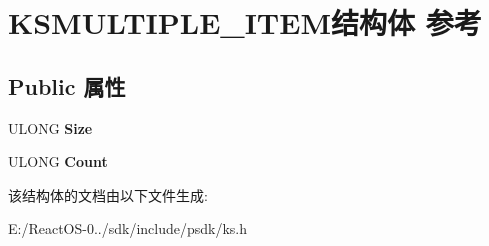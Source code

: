 \hypertarget{struct_k_s_m_u_l_t_i_p_l_e___i_t_e_m}{}\section{K\+S\+M\+U\+L\+T\+I\+P\+L\+E\+\_\+\+I\+T\+E\+M结构体 参考}
\label{struct_k_s_m_u_l_t_i_p_l_e___i_t_e_m}
\subsection*{Public 属性}
\begin{DoxyCompactItemize}
\item 
\mbox{\label{struct_k_s_m_u_l_t_i_p_l_e___i_t_e_m_a54498b17fc44b94f5d3aa99b26310234}} 
U\+L\+O\+NG {\bfseries Size}
\item 
\mbox{\label{struct_k_s_m_u_l_t_i_p_l_e___i_t_e_m_a5e51604ca38ba7ce256dae4d28396c64}} 
U\+L\+O\+NG {\bfseries Count}
\end{DoxyCompactItemize}


该结构体的文档由以下文件生成\+:\begin{DoxyCompactItemize}
\item 
E\+:/\+React\+O\+S-\/0../sdk/include/psdk/ks.\+h\end{DoxyCompactItemize}
